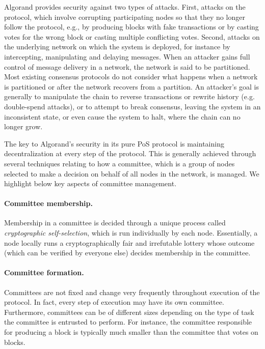 Algorand provides security against two types of attacks.
First, attacks on the protocol, which involve corrupting participating nodes so that they no longer follow the protocol, e.g., by producing blocks with fake transactions or by casting votes for the wrong block or casting multiple conflicting votes. 
Second, attacks on the underlying network on which the system is deployed, for instance by intercepting, manipulating and delaying messages. When an attacker gains full control of message delivery in a network, the network is said to be partitioned. Most existing consensus protocols do not consider what happens when a network is partitioned or after the network recovers from a partition.
An attacker's goal is generally to manipulate the chain to reverse transactions or rewrite history (e.g. double-spend attacks), or to attempt to break consensus, leaving the system in an inconsistent state, or even cause the system to halt, where the chain can no longer grow.

The key to Algorand's security in its pure PoS protocol is maintaining decentralization at every step of the protocol. This is generally achieved through several techniques relating to how a committee, which is a group of nodes selected to make a decision on behalf of all nodes in the network, is managed. We highlight below key aspects of committee management.

\paragraph{Committee membership.} Membership in a committee is decided through a unique process called \textit{cryptographic self-selection}, which is run individually by each node. Essentially, a node locally runs a cryptographically fair and irrefutable lottery whose outcome (which can be verified by everyone else) decides membership in the committee.

\paragraph{Committee formation.} Committees are not fixed and change very frequently throughout execution of the protocol. In fact, every step of execution may have its own committee. Furthermore, committees can be of different sizes depending on the type of task the committee is entrusted to perform. For instance, the committee responsible for producing a block is typically much smaller than the committee that votes on blocks.

